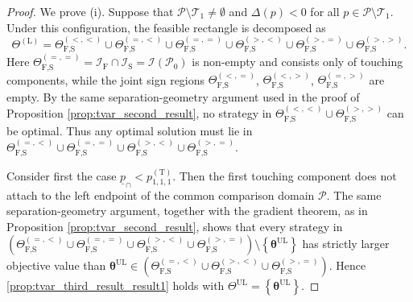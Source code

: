 \documentclass[a4paper,12pt]{article}
\begin{document}
\begin{proof}
We prove (i). Suppose that $\mathcal{P}\setminus\mathcal{T}_1\neq\emptyset$ and $\Delta\left(p\right)<0$ for all $p\in\mathcal{P}\setminus\mathcal{T}_1$. Under this configuration, the feasible rectangle is decomposed as
\begin{equation*}
\Theta^{\left(\text{L}\right)}=\Theta_{\text{F,S}}^{\left(<,<\right)}\cup\Theta_{\text{F,S}}^{\left(=,<\right)}\cup\Theta_{\text{F,S}}^{\left(=,=\right)}\cup\Theta_{\text{F,S}}^{\left(>,<\right)}\cup\Theta_{\text{F,S}}^{\left(>,=\right)}\cup\Theta_{\text{F,S}}^{\left(>,>\right)}.
\end{equation*}
Here $\Theta_{\text{F,S}}^{\left(=,=\right)}=\mathcal{I}_{\text{F}}\cap\mathcal{I}_{\text{S}}=\mathcal{I}\left(\mathcal{P}_0\right)$ is non-empty and consists only of touching components, while the joint sign regions $\Theta_{\text{F,S}}^{\left(<,=\right)}$, $\Theta_{\text{F,S}}^{\left(<,>\right)}$, $\Theta_{\text{F,S}}^{\left(=,>\right)}$ are empty. By the same separation-geometry argument used in the proof of Proposition \ref{prop:tvar_second_result}, no strategy in $\Theta_{\text{F,S}}^{\left(<,<\right)}\cup\Theta_{\text{F,S}}^{\left(>,>\right)}$ can be optimal. Thus any optimal solution must lie in $\Theta_{\text{F,S}}^{\left(=,<\right)}\cup\Theta_{\text{F,S}}^{\left(=,=\right)}\cup\Theta_{\text{F,S}}^{\left(>,<\right)}\cup\Theta_{\text{F,S}}^{\left(>,=\right)}$.

Consider first the case $\underline{p}_{\cap}<p^{\left(\text{T}\right)}_{1,1,1}$. Then the first touching component does not attach to the left endpoint of the common comparison domain $\mathcal{P}$. The same separation-geometry argument, together with the gradient theorem, as in Proposition \ref{prop:tvar_second_result}, shows that every strategy in $\left(\Theta_{\text{F,S}}^{\left(=,<\right)}\cup\Theta_{\text{F,S}}^{\left(=,=\right)}\cup\Theta_{\text{F,S}}^{\left(>,<\right)}\cup\Theta_{\text{F,S}}^{\left(>,=\right)}\right)\setminus\left\{{\bm\theta}^{\text{UL}}\right\}$ has strictly larger objective value than ${\bm\theta}^{\text{UL}}\in\left(\Theta_{\text{F,S}}^{\left(=,<\right)}\cup\Theta_{\text{F,S}}^{\left(>,<\right)}\cup\Theta_{\text{F,S}}^{\left(>,=\right)}\right)$. Hence \eqref{prop:tvar_third_result_result1} holds with $\Theta^{\text{UL}}=\left\{{\bm\theta}^{\text{UL}}\right\}$.


\end{proof}
\end{document}
